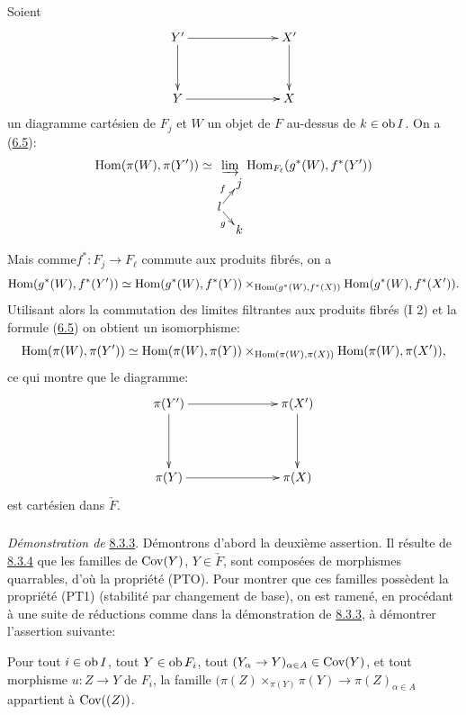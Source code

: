 \documentclass[10pt]{../fichiers-configuration-latex/smfart}
\begin{document}
Soient
\[
\xymatrix@C=2.5cm@R=1.25cm{
Y'  \ar[r] \ar[d]& X' \ar[d]\\
Y  \ar[r]  & X
}
\]
un diagramme cartésien de $F_j$ et $W$ un objet de $F$ au-dessus de $k
\in \operatorname{ob} I$. On a (\hyperref[VI.prop6.5]{6.5}):
\def\labelstyle{\scriptstyle}
$$\displaystyle{\Hom(\pi(W),\pi(Y'))\simeq\mathop{\varinjlim_{
\xymatrix@R=.3cm@C=.3cm@M=.05cm{
            & j\\
        l \ar[ru]^{f} \ar[rd]_{g} &    \\
            & k
}}}\Hom_{F_{\ell}}(g^{\ast}(W),f^{\ast}(Y'))}$$

Mais comme\pageoriginale $f^{\ast} : F_j \to F_{\ell}$ commute aux
produits fibrés, on a
$$
\operatorname{Hom}(g^{\ast}(W), f^{\ast}(Y')) \simeq \operatorname{Hom}(g^{\ast}(W), f^{\ast}(Y))
\times_{\operatorname{Hom}(g^{\ast}(W), f^{\ast}(X))} \operatorname{Hom}(g^{\ast}(W){},
f^{\ast}(X')).
$$
Utilisant alors la commutation des limites filtrantes aux produits
fibrés (I 2) et la formule (\hyperref[VI.prop6.5]{6.5}) on obtient un
isomorphisme:
$$
\operatorname{Hom}(\pi(W), \pi(Y')) \simeq \operatorname{Hom}(\pi(W), \pi(Y)) \times_{\operatorname{Hom}(\pi(W),
  \pi(X))} \operatorname{Hom}(\pi(W), \pi(X')){},
$$
ce qui montre que le diagramme:
\[
\xymatrix@C=2.5cm@R=1.5cm{
\pi(Y')  \ar[r] \ar[d]& \pi(X')\ar[d]\\
\pi(Y)    \ar[r] & \pi(X)
}
\]
est cartésien dans $\underrightarrow{F}$.

\setcounter{subsubsection}{4}
\subsubsection{}
\emph{Démonstration de} \hyperref[VI.prop8.3.3]{8.3.3}. Démontrons d'abord la
deuxième assertion. Il résulte de \hyperref[VI.lem8.3.4]{8.3.4} que les familles
de $\operatorname{Cov}(Y)$, $Y \in \underrightarrow{F}$, sont composées de
morphismes quarrables, d'où la propriété (PTO). Pour montrer que
ces familles possèdent la propriété (PT1) (stabilité par changement
de base), on est ramené, en procédant à une suite de réductions
comme dans la démonstration de \hyperref[VI.prop8.3.3]{8.3.3}, à démontrer
l'assertion suivante:

Pour tout $i \in \operatorname{ob} I$, tout $Y \in \operatorname{ob} F_i$, tout $(Y_{\alpha} \to
Y)_{\alpha \in A} \in \Cov(Y)$, et tout morphisme $u : Z \to Y$ de
$F_i$, la famille $(\pi(Z) \times_{\pi(Y)} \pi(Y) \to \pi(Z)_{\alpha
  \in A}$ appartient à $\operatorname{Cov}((Z))$.
\end{document}
